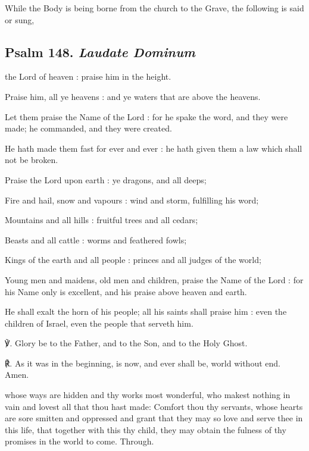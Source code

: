 \begin{rubric}
    While the Body is being borne from the church to the Grave, the following is said or sung,
\end{rubric}

\subsection{Psalm 148. \textit{Laudate Dominum}}
 the Lord of heaven : praise him in the height.\par
{}
Praise him, all ye heavens : and ye waters that are above the heavens.\par
{}Let them praise the Name of the Lord : for he spake the word, and they were made; he commanded, and they were created.\par
{}He hath made them fast for ever and ever : he hath given them a law which shall not be broken.\par
{}Praise the Lord upon earth : ye dragons, and all deeps;\par
{}Fire and hail, snow and vapours : wind and storm, fulfilling his word;\par
{}Mountains and all hills : fruitful trees and all cedars;\par
{}Beasts and all cattle : worms and feathered fowls;\par
{}Kings of the earth and all people : princes and all judges of the world;\par
{}Young men and maidens, old men and children, praise the Name of the Lord : for his Name only is excellent, and his praise above heaven and earth.\par
{}He shall exalt the horn of his people; all his saints shall praise him : even the children of Israel, even the people that serveth him.\par
℣. Glory be to the Father, and to the Son, and to the Holy Ghost.\par
℟. As it was in the beginning, is now, and ever shall be, world without end. Amen.

 whose ways are hidden and thy works most wonderful, who makest nothing in vain and lovest all that thou hast made: Comfort thou thy servants, whose hearts are sore smitten and oppressed and grant that they may so love and serve thee in this life, that together with this thy child, they may obtain the fulness of thy promises in the world to come. Through.

